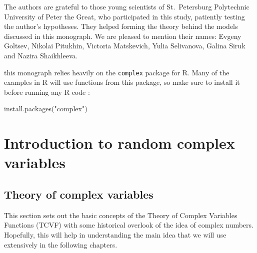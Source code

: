 \documentclass[
]{book}
\newenvironment{Shaded}{\begin{snugshade}}{\end{snugshade}}
\newcommand{\FunctionTok}[1]{\textcolor[rgb]{0.00,0.00,0.00}{#1}}
\newcommand{\NormalTok}[1]{#1}
\newcommand{\StringTok}[1]{\textcolor[rgb]{0.31,0.60,0.02}{#1}}
\begin{document}
The authors are grateful to those young scientists of St.~Petersburg Polytechnic University of Peter the Great, who participated in this study, patiently testing the author's hypotheses. They helped forming the theory behind the models discussed in this monograph. We are pleased to mention their names: Evgeny Goltsev, Nikolai Pitukhin, Victoria Matskevich, Yulia Selivanova, Galina Siruk and Nazira Shaikhleeva.

this monograph relies heavily on the \texttt{complex} package for R. Many of the examples in R will use functions from this package, so make sure to install it before running any R code \citep{R-complex}:

\begin{Shaded}
\begin{Highlighting}[]
\FunctionTok{install.packages}\NormalTok{(}\StringTok{"complex"}\NormalTok{)}
\end{Highlighting}
\end{Shaded}

\hypertarget{intro}{%
\chapter{Introduction to random complex variables}\label{intro}}

\hypertarget{theory-of-complex-variables}{%
\section{Theory of complex variables}\label{theory-of-complex-variables}}

This section sets out the basic concepts of the Theory of Complex Variables Functions (TCVF) with some historical overlook of the idea of complex numbers. Hopefully, this will help in understanding the main idea that we will use extensively in the following chapters.
\end{document}
